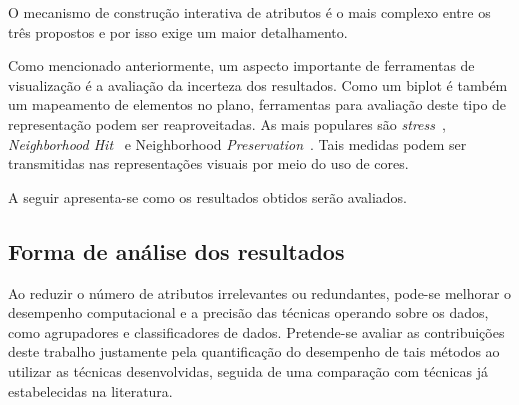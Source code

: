 O mecanismo de construção interativa de atributos é o mais
complexo entre os três propostos e por isso exige um maior
detalhamento.

Como mencionado anteriormente, um aspecto importante de
ferramentas de visualização é a avaliação da incerteza dos
resultados. Como um biplot é também um mapeamento de
elementos no plano, ferramentas para avaliação deste tipo de
representação podem ser reaproveitadas. As mais populares
são \emph{stress}~\cite{Kruskal1964}, \emph{Neighborhood
Hit}~\cite{Paulovich2008} e Neighborhood
\emph{Preservation}~\cite{Paulovich2008a}. Tais medidas
podem ser transmitidas nas representações visuais por meio
do uso de cores. 

A seguir apresenta-se como os resultados obtidos serão avaliados.

\subsection{Forma de análise dos resultados}

Ao reduzir o número de atributos irrelevantes ou
redundantes, pode-se melhorar o desempenho computacional e a
precisão das técnicas operando sobre os dados, como
agrupadores e classificadores de dados. Pretende-se avaliar
as contribuições deste trabalho justamente pela
quantificação do desempenho de tais métodos ao utilizar as
técnicas desenvolvidas, seguida de uma comparação com
técnicas já estabelecidas na literatura.



